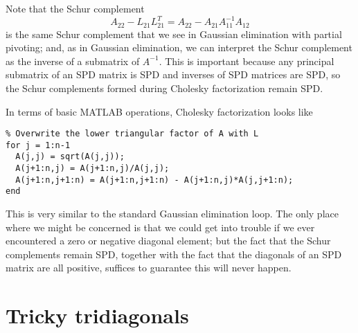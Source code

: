 \documentclass[12pt, leqno]{article}
\begin{document}
Note that the Schur complement
\[
  A_{22}-L_{21} L_{21}^T = A_{22} - A_{21} A_{11}^{-1} A_{12}
\]
is the same Schur complement that we see in Gaussian elimination
with partial pivoting; and, as in Gaussian elimination, we can
interpret the Schur complement as the inverse of a submatrix
of $A^{-1}$.  This is important because any principal submatrix of
an SPD matrix is SPD and inverses of SPD matrices are SPD, so
the Schur complements formed during Cholesky factorization remain
SPD.

In terms of basic MATLAB operations, Cholesky factorization looks like
\begin{lstlisting}
% Overwrite the lower triangular factor of A with L
for j = 1:n-1
  A(j,j) = sqrt(A(j,j));
  A(j+1:n,j) = A(j+1:n,j)/A(j,j);
  A(j+1:n,j+1:n) = A(j+1:n,j+1:n) - A(j+1:n,j)*A(j,j+1:n);
end
\end{lstlisting}
This is very similar to the standard Gaussian elimination loop.
The only place where we might be concerned is that we could get
into trouble if we ever encountered a zero or negative diagonal
element; but the fact that the Schur complements remain SPD, together
with the fact that the diagonals of an SPD matrix are all positive,
suffices to guarantee this will never happen.

\section{Tricky tridiagonals}
\end{document}

